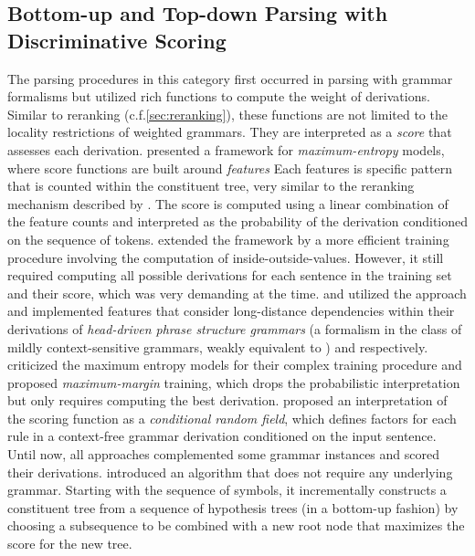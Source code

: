 \documentclass[../document.tex]{subfiles}
\begin{document}
    \subsection{Bottom-up and Top-down Parsing with Discriminative Scoring}\label{sec:literature:chart}
    The parsing procedures in this category first occurred in parsing with grammar formalisms but utilized rich functions to compute the weight of derivations.
    Similar to reranking (c.f.\@ \cref{sec:reranking}), these functions are not limited to the locality restrictions of weighted grammars.
    They are interpreted as a \emph{score} that assesses each derivation.
     presented a framework for \emph{maximum-entropy} models, where score functions are built around \emph{features}
    Each features is specific pattern that is counted within the constituent tree, very similar to the reranking mechanism described by \citet{collins2001convolution}.
    The score is computed using a linear combination of the feature counts and interpreted as the probability of the derivation conditioned on the sequence of tokens.
     extended the framework by a more efficient training procedure involving the computation of inside-outside-values.
    However, it still required computing all possible derivations for each sentence in the training set and their score, which was very demanding at the time.
     and \citet{Clark04a} utilized the approach and implemented features that consider long-distance dependencies within their derivations of \emph{head-driven phrase structure grammars} (a formalism in the class of mildly context-sensitive grammars, weakly equivalent to ) and  respectively.
     criticized the maximum entropy models for their complex training procedure and proposed \emph{maximum-margin} training, which drops the probabilistic interpretation but only requires computing the best derivation.
     proposed an interpretation of the scoring function as a \emph{conditional random field}, which defines factors for each rule in a context-free grammar derivation conditioned on the input sentence.
    Until now, all approaches complemented some grammar instances and scored their derivations.
     introduced an algorithm that does not require any underlying grammar.
    Starting with the sequence of  symbols, it incrementally constructs a constituent tree from a sequence of hypothesis trees (in a bottom-up fashion) by choosing a subsequence to be combined with a new root node that maximizes the score for the new tree.
\end{document}
